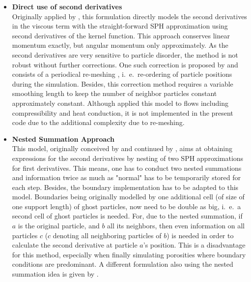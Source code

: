 \documentclass{report}
\begin{document}
\begin{itemize}
\item {\bf Direct use of second derivatives}\\
Originally applied by \cite{Flebbe1994, Watkins1996}, this formulation directly models the second derivatives in the viscous term with the straight-forward SPH approximation using second derivatives of the kernel function. This approach conserves linear momentum exactly, but angular momentum only approximately. As the second derivatives are very sensitive to particle disorder, the method is not robust without further corrections. One such correction is proposed by \cite{Chaniotis2002} and consists of a periodical re-meshing , i.\ e.\ re-ordering of particle positions during the simulation. Besides, this correction method requires a variable smoothing length to keep the number of neighbor particles constant approximately constant. Although \cite{Chaniotis2002} applied this model to flows including compressibility and heat conduction, it is not implemented in the present code due to the additional complexity due to re-meshing.

\item {\bf Nested Summation Approach}\\
This model, originally conceived by \cite{Flebbe1994} and continued by \cite{Speith1999}, aims at obtaining expressions for the second derivatives by nesting of two SPH approximations for first derivatives. This means, one has to conduct two nested summations and information twice as much as "normal" has to be temporarily stored for each step. Besides, the boundary implementation has to be adapted to this model. Boundaries being originally modelled by one additional cell (of size of one support length) of ghost particles, now need to be double as big, i.\ e.\ a second cell of ghost particles is needed. For, due to the nested summation, if $a$ is the original particle, and $b$ all its neighbors, then even information on all particles $c$ ($c$ denoting all neighboring particles of $b$) is needed in order to calculate the second derivative at particle $a$'s position.
This is a disadvantage for this method, especially when finally simulating porosities where boundary conditions are predominant.
A different formulation also using the nested summation idea is given by \cite{Watkins1996}.


\end{itemize}
\end{document}
